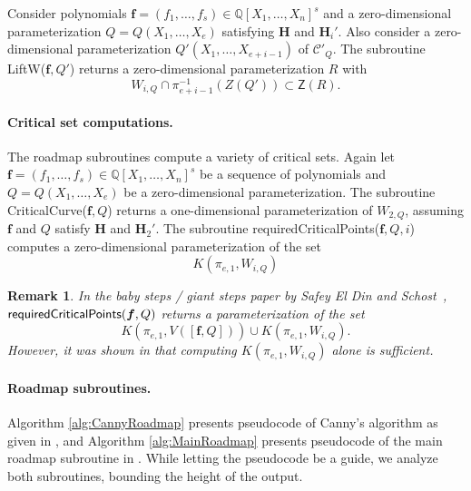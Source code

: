 \documentclass[12pt]{article}
\def\Q{\mathbb{Q}}
\newtheorem{remark}[theorem]{Remark}
\def\Zeroes{\mathsf{Z}}
\def\LiftW{{\sf LiftW}}
\def\CriticalCurve{{\sf CriticalCurve}}
\def\requiredCriticalPoints{{\sf requiredCriticalPoints}}
\def\Q{\mathbb{Q}}
\begin{document}
Consider polynomials $\bm f = (f_1,\hdots,f_s) \in \Q[X_1,\hdots,X_n]^s$ and a zero-dimensional parameterization $Q=Q(X_1,\hdots,X_e)$ satisfying $\bm H$ and $\bm H_i'$. Also consider a zero-dimensional parameterization $Q'(X_1,\hdots,X_{e+i-1})$ of $\mathscr{C}'_Q.$ The subroutine {\LiftW}($\bm f, Q'$) returns a zero-dimensional parameterization $R$ with 
\[
W_{i, Q} \cap \pi_{e+i-1}^{-1}(Z(Q')) \subset \Zeroes(R).
\]






\paragraph*{Critical set computations.} The roadmap subroutines compute a variety of critical sets. Again let $\bm f = (f_1,\hdots,f_s) \in \mathbb{Q}[X_1,\hdots,X_n]^s$ be a sequence of polynomials and $Q=Q(X_1,\hdots,X_e)$ be a zero-dimensional parameterization. 
The subroutine {\CriticalCurve}($\bm f, Q$) returns a one-dimensional parameterization of $W_{2, Q}$, assuming $\bm f$ and $Q$ satisfy $\bm H$ and $\bm H_2'$. The subroutine {\requiredCriticalPoints}($\bm f,Q,i$) computes a zero-dimensional parameterization of the set 
\[ 
K(\pi_{e,1},W_{i,Q})
\]
\begin{remark}
    In the baby steps / giant steps paper by Safey El Din and Schost~\cite{SchostMohabBabySteps2011}, $\requiredCriticalPoints(\bm f, Q)$ returns a parameterization of the set 
    \[
K(\pi_{e,1},V([\bm f,Q])) \cup 
K(\pi_{e,1},W_{i,Q}).
    \]
    However, it was shown in \cite{prébet2024computingroadmapsunboundedsmooth} that computing $K(\pi_{e,1},W_{i,Q})$ alone is sufficient. 
\end{remark}






\paragraph*{Roadmap subroutines.}\label{sec:Canny}
Algorithm \ref{alg:CannyRoadmap} presents pseudocode of Canny's algorithm as given in \cite{SchostMohabBabySteps2011}, and   Algorithm \ref{alg:MainRoadmap} presents pseudocode of the main roadmap subroutine in \cite{SchostMohabBabySteps2011}. While letting the pseudocode be a guide, we analyze both subroutines, bounding the height of the output. 
\end{document}
